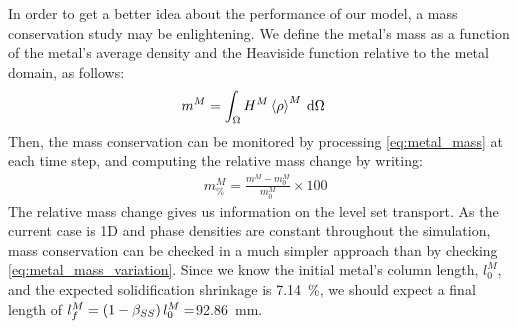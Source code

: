 In order to get a better idea about the performance of our model, a mass conservation study may be enlightening. 
We define the metal's mass as a function of the 
metal's average density and the Heaviside function relative to the metal domain, as follows:
\begin{align}
\label{eq:metal_mass}
& m^M = \int_{\Omega} H^M \left \langle \rho \right \rangle^M\: \mathrm{d}\Omega	
\end{align}
Then, the mass conservation can be monitored by processing \cref{eq:metal_mass} at each time step, and computing
the relative mass change by writing:
\begin{align}
\label{eq:metal_mass_variation}
&  m^M_\% = \frac{m^M - m^M_0}{m^M_0} \times 100	
\end{align}
The relative mass change gives us information on the level set transport.
As the current case is 1D and phase densities are constant throughout the simulation, mass conservation can be 
checked in a much simpler approach than by checking \cref{eq:metal_mass_variation}. Since we know the initial metal's column
length, $l^M_0$, and the expected solidification shrinkage is \SI{7.14}{\percent}, we should expect a final length of 
$l^M_f= \left( 1-\beta_{SS} \right) l^M_0 =$\SI{92.86}{\milli\metre}. 

